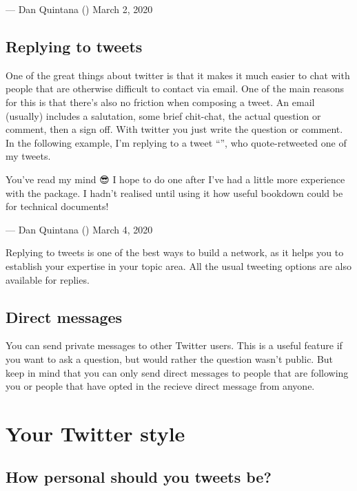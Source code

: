 \documentclass[]{book}
\begin{document}
--- Dan Quintana (\citet{dsquintana}) March 2, 2020

\hypertarget{replying-to-tweets}{%
\subsection{Replying to tweets}\label{replying-to-tweets}}

One of the great things about twitter is that it makes it much easier to chat with people that are otherwise difficult to contact via email. One of the main reasons for this is that there's also no friction when composing a tweet. An email (usually) includes a salutation, some brief chit-chat, the actual question or comment, then a sign off. With twitter you just write the question or comment. In the following example, I'm replying to a tweet ``\citet{xieyihui}'', who quote-retweeted one of my tweets.

You've read my mind 😎 I hope to do one after I've had a little more experience with the package. I hadn't realised until using it how useful bookdown could be for technical documents!

--- Dan Quintana (\citet{dsquintana}) March 4, 2020

Replying to tweets is one of the best ways to build a network, as it helps you to establish your expertise in your topic area. All the usual tweeting options are also available for replies.

\hypertarget{direct-messages}{%
\subsection{Direct messages}\label{direct-messages}}

You can send private messages to other Twitter users. This is a useful feature if you want to ask a question, but would rather the question wasn't public. But keep in mind that you can only send direct messages to people that are following you or people that have opted in the recieve direct message from anyone.

\hypertarget{your-twitter-style}{%
\section{Your Twitter style}\label{your-twitter-style}}

\hypertarget{how-personal-should-you-tweets-be}{%
\subsection{How personal should you tweets be?}\label{how-personal-should-you-tweets-be}}
\end{document}
